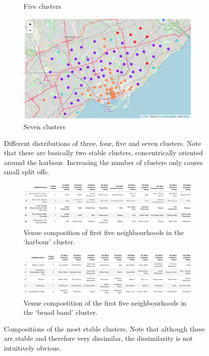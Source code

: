 \documentclass{article}
\begin{document}
\begin{figure}[ht]
\begin{subfigure}[b]{0.47\textwidth}
         \caption{Five clusters}
     \end{subfigure}\hfill
     \begin{subfigure}[b]{0.47\textwidth}
         \centering
         \includegraphics[width=\textwidth]{pics/clusters7}
         \caption{Seven clusters}
     \end{subfigure}
     \caption{Different distributions of three, four, five and seven clusters. Note that there are basically two stable clusters, concentrically oriented around the harbour. Increasing the number of clusters only causes small split offs.}
        \label{fig:nbhclusters}
\end{figure}
\begin{figure}[ht]
     \centering
        \begin{subfigure}[b]{\textwidth}
            \centering
            \includegraphics[width=\textwidth]{pics/composition_0}
            \caption{Venue composition of first five neighbourhoods in the `harbour' cluster.}
        \end{subfigure}
        \begin{subfigure}[b]{\textwidth}
            \centering
            \includegraphics[width=\textwidth]{pics/composition_2}
            \caption{Venue compostition of the first five neighbourhoods in the `broad band' cluster.}
        \end{subfigure}
        \caption{Compositions of the most stable clusters. Note that although these are stable and therefore very dissimilar, the dissimilarity is not intuitively obvious.}
        \label{fig:composition}
\end{figure}
\end{document}

